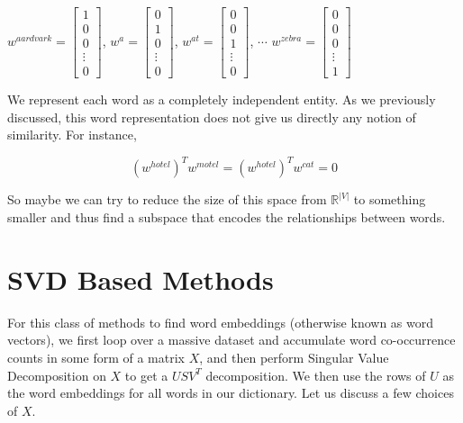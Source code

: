 \documentclass[nobib]{tufte-handout}
\begin{document}
$w^{aardvark} = \left[ \begin{array}{c} 1 \\ 0 \\ 0 \\ \vdots \\ 0 \end{array} \right]$, $w^{a} = \left[ \begin{array}{c} 0 \\ 1 \\ 0 \\ \vdots \\ 0 \end{array} \right] $, $w^{at} = \left[ \begin{array}{c} 0 \\ 0 \\ 1 \\ \vdots \\ 0 \end{array} \right] $, $\cdots$ $w^{zebra} = \left[ \begin{array}{c} 0 \\ 0 \\ 0 \\ \vdots \\ 1 \end{array} \right] $


We represent each word as a completely independent entity. As we previously discussed, this word representation does not give us directly any notion of similarity. For instance,

$$(w^{hotel})^Tw^{motel} = (w^{hotel})^Tw^{cat} = 0$$

So maybe we can try to reduce the size of this space from $\mathbb{R}^|V|$ to something smaller and thus find a subspace that encodes the relationships between words.

\section{SVD Based Methods}\label{sec:svdmethods}

For this class of methods to find word embeddings (otherwise known as word vectors), we first loop over a massive dataset and accumulate word co-occurrence counts in some form of a matrix $X$, and then perform Singular Value Decomposition on $X$ to get a $USV^T$ decomposition. We then use the rows of $U$ as the word embeddings for all words in our dictionary. Let us discuss a few choices of $X$.
\end{document}
